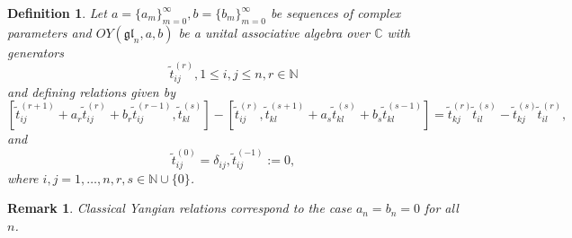 \documentclass[10pt]{article}%
\numberwithin{equation}{section}
\newtheorem{defin}[thm]{Definition}
\newtheorem{rem}[thm]{Remark}
\newcommand{\gl}{{\mathfrak{gl}}}
\begin{document}
\begin{defin}
Let $a=\{a_m\}_{m=0}^{\infty}, b=\{b_m\}_{m=0}^{\infty}$ be sequences of complex parameters and  $OY(\gl_n,a,b)$ be a unital associative algebra over $\mathbb{C}$ with generators
\[
\tilde{t}_{ij}^{(r)}, 1\leq i,j\leq n, r\in \mathbb{N}
\]
 and defining relations given by
\begin{equation}\label{eqn:GenYangian_1}
[\tilde{t}^{(r+1)}_{ij}+ a_r \tilde{t}^{(r)}_{ij}+b_r \tilde{t}^{(r-1)}_{ij},\tilde{t}^{(s)}_{kl}]-[\tilde{t}^{(r)}_{ij},\tilde{t}^{(s+1)}_{kl}+a_s \tilde{t}^{(s)}_{kl}+b_s \tilde{t}^{(s-1)}_{kl}]
=\tilde{t}^{(r)}_{kj}\tilde{t}^{(s)}_{il}-\tilde{t}^{(s)}_{kj}\tilde{t}^{(r)}_{il},
\end{equation}
and
\[
\tilde{t}_{ij}^{(0)}=\delta_{ij},\tilde{t}_{ij}^{(-1)}:=0,
\]
where $i,j=1,\ldots,n,r,s\in \mathbb{N}\cup\{0\}$.
\end{defin}
\begin{rem}
Classical  Yangian relations correspond to the case $a_n=b_n=0$ for all $n$.
\end{rem}
\end{document}
